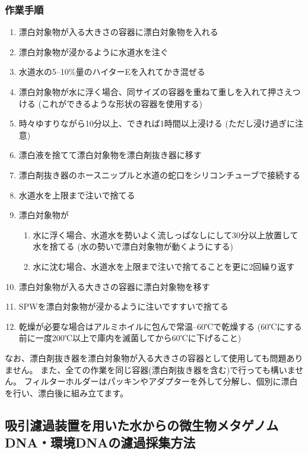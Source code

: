 \documentclass[titlepage,10pt,a4paper,uplatex]{jsbook}
\begin{document}
\subsubsection{作業手順}
\begin{enumerate}
\item 漂白対象物が入る大きさの容器に漂白対象物を入れる
\item 漂白対象物が浸かるように水道水を注ぐ
\item 水道水の5--10\%量のハイターEを入れてかき混ぜる
\item 漂白対象物が水に浮く場合、同サイズの容器を重ねて重しを入れて押さえつける (これができるような形状の容器を使用する)
\item 時々ゆすりながら10分以上、できれば1時間以上浸ける (ただし浸け過ぎに注意)
\item 漂白液を捨てて漂白対象物を漂白剤抜き器に移す
\item 漂白剤抜き器のホースニップルと水道の蛇口をシリコンチューブで接続する
\item 水道水を上限まで注いで捨てる
\item 漂白対象物が
\begin{enumerate}
\item 水に浮く場合、水道水を勢いよく流しっぱなしにして30分以上放置して水を捨てる (水の勢いで漂白対象物が動くようにする)
\item 水に沈む場合、水道水を上限まで注いで捨てることを更に2回繰り返す
\end{enumerate}
\item 漂白対象物が入る大きさの容器に漂白対象物を移す
\item SPWを漂白対象物が浸かるように注いですすいで捨てる
\item 乾燥が必要な場合はアルミホイルに包んで常温--60℃で乾燥する (60℃にする前に一度200℃以上で庫内を滅菌してから60℃に下げること)
\end{enumerate}

なお、漂白剤抜き器を漂白対象物が入る大きさの容器として使用しても問題ありません。
また、全ての作業を同じ容器(漂白剤抜き器を含む)で行っても構いません。
フィルターホルダーはパッキンやアダプターを外して分解し、個別に漂白を行い、漂白後に組み立てます。

\subsection{吸引濾過装置を用いた水からの微生物メタゲノムDNA・環境DNAの濾過採集方法}
\end{document}
